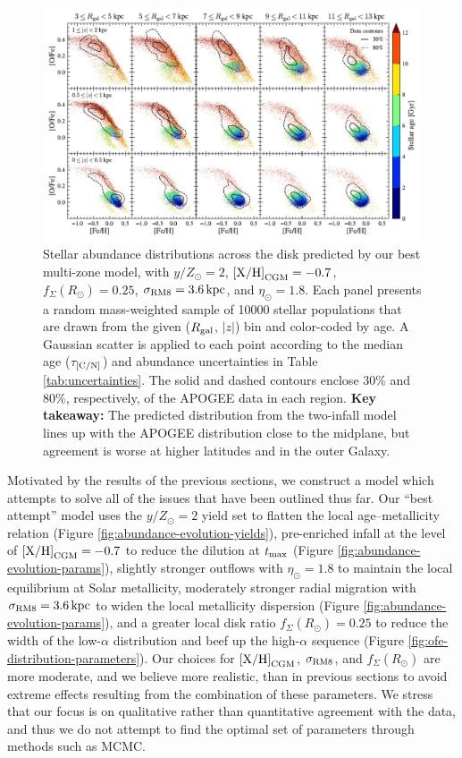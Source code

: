 \documentclass[twocolumn,twocolappendix,linenumbers]{aastex631}
\newcommand{\mathXH}{{\rm [X/H]}}
\newcommand{\yZ}[1]{$y/Z_\odot=#1$}
\newcommand{\kpc}{\,{\rm kpc}}
\begin{document}
\begin{figure}
    \centering
    \includegraphics[width=\linewidth]{figures/ofe_feh_best.pdf}
    \caption{Stellar abundance distributions across the disk predicted by our best multi-zone model, with \yZ{2}, ${\rm [X/H]}_{\rm CGM}=-0.7$, $f_\Sigma(R_\odot)=0.25$, $\sigma_{\rm RM8}=3.6\kpc$, and $\eta_\odot=1.8$. Each panel presents a random mass-weighted sample of \num{10000} stellar populations that are drawn from the given ($R_{\rm gal}$, $|z|$) bin and color-coded by age. A Gaussian scatter is applied to each point according to the median age ($\tau_{\rm [C/N]}$) and abundance uncertainties in Table \ref{tab:uncertainties}. The solid and dashed contours enclose 30\% and 80\%, respectively, of the APOGEE data in each region. {\bf Key takeaway:} The predicted distribution from the two-infall model lines up with the APOGEE distribution close to the midplane, but agreement is worse at higher latitudes and in the outer Galaxy.}
    \label{fig:ofe-feh-best}
\end{figure}

Motivated by the results of the previous sections, we construct a model which attempts to solve all of the issues that have been outlined thus far. Our ``best attempt'' model uses the \yZ{2} yield set to flatten the local age--metallicity relation (Figure \ref{fig:abundance-evolution-yields}), pre-enriched infall at the level of $\mathXH_{\rm CGM}=-0.7$ to reduce the dilution at $t_{\rm max}$ (Figure \ref{fig:abundance-evolution-params}), slightly stronger outflows with $\eta_\odot=1.8$ to maintain the local equilibrium at Solar metallicity, moderately stronger radial migration with $\sigma_{\rm RM8}=3.6\kpc$ to widen the local metallicity dispersion (Figure \ref{fig:abundance-evolution-params}), and a greater local disk ratio $f_\Sigma(R_\odot)=0.25$ to reduce the width of the low-$\alpha$ distribution and beef up the high-$\alpha$ sequence (Figure \ref{fig:ofe-distribution-parameters}). Our choices for $\mathXH_{\rm CGM}$, $\sigma_{\rm RM8}$, and $f_\Sigma(R_\odot)$ are more moderate, and we believe more realistic, than in previous sections to avoid extreme effects resulting from the combination of these parameters. We stress that our focus is on qualitative rather than quantitative agreement with the data, and thus we do not attempt to find the optimal set of parameters through methods such as MCMC.
\end{document}
